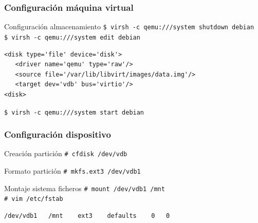 \documentclass{beamer}
\begin{document}
\begin{frame}[fragile]
  \frametitle{Configuración máquina virtual}
  \begin{block}{Configuración almacenamiento}
    \texttt{\$ virsh -c qemu:///system shutdown debian} \\
    \texttt{\$ virsh -c qemu:///system edit debian} \\
    \small{\begin{verbatim}
<disk type='file' device='disk'>
   <driver name='qemu' type='raw'/>
   <source file='/var/lib/libvirt/images/data.img'/>
   <target dev='vdb' bus='virtio'/>
<disk>
   \end{verbatim}}
   \texttt{\$ virsh -c qemu:///system start debian}
  \end{block}
\end{frame}

\begin{frame}[fragile]
  \frametitle{Configuración dispositivo}
  \begin{block}{Creación partición}
    \texttt{\# cfdisk /dev/vdb}
  \end{block}
  \begin{block}{Formato partición}
    \texttt{\# mkfs.ext3 /dev/vdb1}
  \end{block}
  \begin{block}{Montaje sistema ficheros}
    \texttt{\# mount /dev/vdb1 /mnt} \\
    \texttt{\# vim /etc/fstab} \\
    \small{\begin{verbatim}
/dev/vdb1	/mnt	ext3	defaults	0	0
    \end{verbatim}}
  \end{block}
\end{frame}
\end{document}
